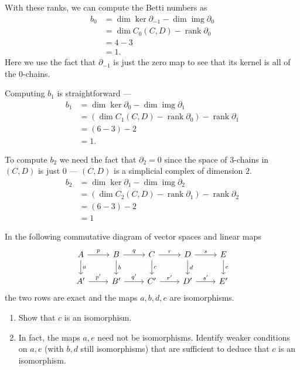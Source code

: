 \documentclass[12 pt, letterpaper]{hmcpset}
\begin{document}
\begin{solution}
\begin{enumerate}
		With these ranks, we can compute the Betti numbers as
		\begin{align*}
			b_{0} & = \dim \ker \partial_{-1} - \dim \operatorname{img} \partial_{0} \\
			      & = \dim C_{0}(C, D) - \operatorname{rank} \partial_{0} \\
			      & = 4 - 3 \\
			      & = 1.
		\end{align*}
		Here we use the fact that $\partial_{-1}$ is just the zero map to see that its kernel is all of the $0$-chains.

		Computing $b_{1}$ is straightforward ---
		\begin{align*}
			b_{1} & = \dim \ker \partial_{0} - \dim \operatorname{img} \partial_{1} \\
			      & = (\dim C_{1}(C, D) - \operatorname{rank} \partial_{0}) - \operatorname{rank} \partial_{1} \\
			      & = (6 - 3) - 2 \\
			      & = 1.
		\end{align*}
		
		To compute $b_{2}$ we need the fact that $\partial_{2} = 0$ since the space of $3$-chains in $(C, D)$ is just $0$ --- $(C, D)$ is a simplicial complex of dimension $2$.
		\begin{align*}
			b_{2} & = \dim \ker \partial_{1} - \dim \operatorname{img} \partial_{2} \\
			      & = (\dim C_{2}(C, D) - \operatorname{rank} \partial_{1}) - \operatorname{rank} \partial_{2} \\
			      & = (6 - 3) - 2 \\
			      & = 1
		\end{align*}
\end{enumerate}
\end{solution}


\pagebreak

\begin{problem}
	In the following commutative diagram of vector spaces and linear maps
	\[
		\begin{tikzcd}
			A \ar[r, "p"] \ar[d, "a"] & B \ar[r, "q"] \ar[d, "b"] & C \ar[r, "r"] \ar[d, "c"] & D \ar[r, "s"] \ar[d, "d"] & E \ar[d, "e"] \\
			A' \ar[r, "p'"] & B' \ar[r, "q'"] & C' \ar[r, "r'"] & D' \ar[r, "s'"] & E'
		\end{tikzcd}
	\]
	the two rows are exact and the maps $a, b, d, e$ are isomorphisms.
	\begin{enumerate}
		\item Show that $c$ is an isomorphism.

		\item In fact, the maps $a, e$ need not be isomorphisms. Identify weaker conditions on $a, e$ (with $b, d$ still isomorphisms) that are sufficient to deduce that $c$ is an isomorphism.
	\end{enumerate}
\end{problem}
\end{document}
